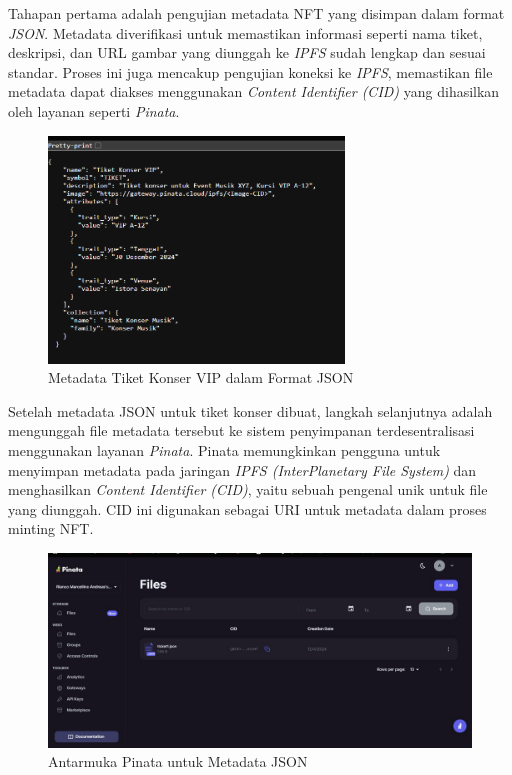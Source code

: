 Tahapan pertama adalah pengujian metadata NFT yang disimpan dalam format \textit{JSON}. Metadata diverifikasi untuk memastikan informasi seperti nama tiket, deskripsi, dan URL gambar yang diunggah ke \textit{IPFS} sudah lengkap dan sesuai standar. Proses ini juga mencakup pengujian koneksi ke \textit{IPFS}, memastikan file metadata dapat diakses menggunakan \textit{Content Identifier (CID)} yang dihasilkan oleh layanan seperti \textit{Pinata}.
\begin{figure}[H]
    \centering
    \includegraphics[width=0.7\textwidth]{gambar/3.2.4.png}
    \caption{Metadata Tiket Konser VIP dalam Format JSON}
    \label{fig:metadata-json}
\end{figure}
Setelah metadata JSON untuk tiket konser dibuat, langkah selanjutnya adalah mengunggah file metadata tersebut ke sistem penyimpanan terdesentralisasi menggunakan layanan \textit{Pinata}. Pinata memungkinkan pengguna untuk menyimpan metadata pada jaringan \textit{IPFS (InterPlanetary File System)} dan menghasilkan \textit{Content Identifier (CID)}, yaitu sebuah pengenal unik untuk file yang diunggah. CID ini digunakan sebagai URI untuk metadata dalam proses minting NFT.

\begin{figure}[H]
    \centering
    \includegraphics[width=1\textwidth]{gambar/3.2.7.jpg}
    \caption{Antarmuka Pinata untuk Metadata JSON}
    \label{fig:pinata-interface}
\end{figure}

